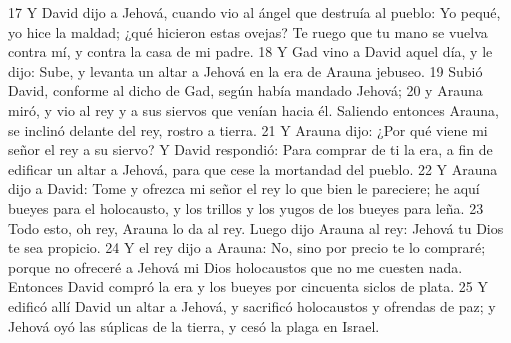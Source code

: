 17 Y David dijo a Jehová, cuando vio al ángel que destruía al pueblo: Yo pequé, yo hice la maldad; ¿qué hicieron estas ovejas? Te ruego que tu mano se vuelva contra mí, y contra la casa de mi padre.
18 Y Gad vino a David aquel día, y le dijo: Sube, y levanta un altar a Jehová en la era de Arauna jebuseo.
19 Subió David, conforme al dicho de Gad, según había mandado Jehová;
20 y Arauna miró, y vio al rey y a sus siervos que venían hacia él. Saliendo entonces Arauna, se inclinó delante del rey, rostro a tierra.
21 Y Arauna dijo: ¿Por qué viene mi señor el rey a su siervo? Y David respondió: Para comprar de ti la era, a fin de edificar un altar a Jehová, para que cese la mortandad del pueblo.
22 Y Arauna dijo a David: Tome y ofrezca mi señor el rey lo que bien le pareciere; he aquí bueyes para el holocausto, y los trillos y los yugos de los bueyes para leña. 
23 Todo esto, oh rey, Arauna lo da al rey. Luego dijo Arauna al rey: Jehová tu Dios te sea propicio.
24 Y el rey dijo a Arauna: No, sino por precio te lo compraré; porque no ofreceré a Jehová mi Dios holocaustos que no me cuesten nada. Entonces David compró la era y los bueyes por cincuenta siclos de plata.
25 Y edificó allí David un altar a Jehová, y sacrificó holocaustos y ofrendas de paz; y Jehová oyó las súplicas de la tierra, y cesó la plaga en Israel.

